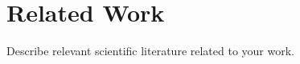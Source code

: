 
\chapter{Related Work}
\label{chap:ch2}
Describe relevant scientific literature related to your work. 

